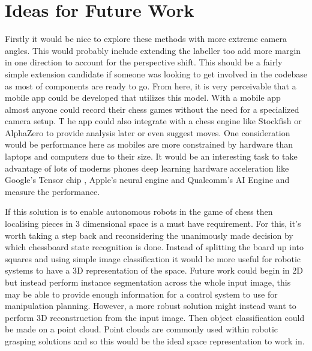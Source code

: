 \section{Ideas for Future Work}
Firstly it would be nice to explore these methods with more extreme camera angles.  This would probably include extending the labeller too add more 
margin in one direction to account for the perspective shift.  This should be a fairly simple extension candidate if someone was looking to 
get involved in the codebase as most of components are ready to go.  From here, it is very perceivable that a mobile app could be developed that utilizes this model. 
With a mobile app almost anyone could record their chess games without the need for a specialized camera setup.  T
he app could also integrate with a chess engine like Stockfish \cite{} or AlphaZero to provide analysis later or even suggest moves.  
One consideration would be performance here as mobiles are more constrained by hardware than laptops and computers due to their size.  
It would be an interesting task to take advantage of lots of moderns phones deep learning hardware acceleration like Google's Tensor chip \cite{}, 
Apple's neural engine \cite{} and Qualcomm's AI Engine \cite{} and measure the performance.

If this solution is to enable autonomous robots in the game of chess then localising pieces in 3 dimensional space is a must have requirement.
For this, it's worth taking a step back and reconsidering the unanimously made decision by which chessboard state recognition is done.  Instead of splitting 
the board up into squares and using simple image classification it would be more useful for robotic systems to have a 3D representation of the space.
Future work could begin in 2D but instead perform instance segmentation across the whole input image, this may be able to provide enough information for a 
control system to use for manipulation planning.  However, a more robust solution might instead want to perform 3D reconstruction from the input image.  
Then object classification could be made on a point cloud.  Point clouds are commonly used within robotic grasping solutions \cite{} and so this would be the ideal 
space representation to work in.